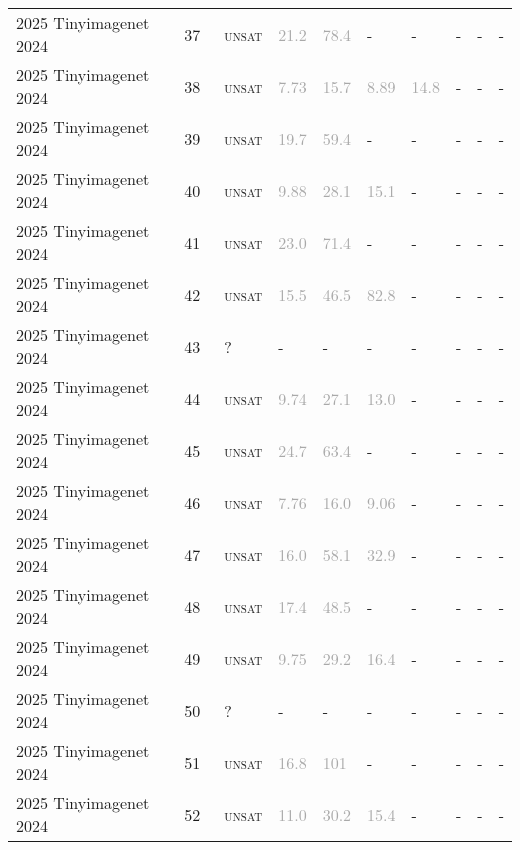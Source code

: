 \begin{center}
{\begin{longtable}{@{}llllllllll@{}}
2025 Tinyimagenet 2024 & 37 & ~\textsc{unsat} & \textcolor{darkgray}{21.2} & \textcolor{darkgray}{78.4} & - & - & - & - & - \\
2025 Tinyimagenet 2024 & 38 & ~\textsc{unsat} & \textcolor{darkgray}{7.73} & \textcolor{darkgray}{15.7} & \textcolor{darkgray}{8.89} & \textcolor{darkgray}{14.8} & - & - & - \\
2025 Tinyimagenet 2024 & 39 & ~\textsc{unsat} & \textcolor{darkgray}{19.7} & \textcolor{darkgray}{59.4} & - & - & - & - & - \\
2025 Tinyimagenet 2024 & 40 & ~\textsc{unsat} & \textcolor{darkgray}{9.88} & \textcolor{darkgray}{28.1} & \textcolor{darkgray}{15.1} & - & - & - & - \\
2025 Tinyimagenet 2024 & 41 & ~\textsc{unsat} & \textcolor{darkgray}{23.0} & \textcolor{darkgray}{71.4} & - & - & - & - & - \\
2025 Tinyimagenet 2024 & 42 & ~\textsc{unsat} & \textcolor{darkgray}{15.5} & \textcolor{darkgray}{46.5} & \textcolor{darkgray}{82.8} & - & - & - & - \\
2025 Tinyimagenet 2024 & 43 & ~? & - & - & - & - & - & - & - \\
2025 Tinyimagenet 2024 & 44 & ~\textsc{unsat} & \textcolor{darkgray}{9.74} & \textcolor{darkgray}{27.1} & \textcolor{darkgray}{13.0} & - & - & - & - \\
2025 Tinyimagenet 2024 & 45 & ~\textsc{unsat} & \textcolor{darkgray}{24.7} & \textcolor{darkgray}{63.4} & - & - & - & - & - \\
2025 Tinyimagenet 2024 & 46 & ~\textsc{unsat} & \textcolor{darkgray}{7.76} & \textcolor{darkgray}{16.0} & \textcolor{darkgray}{9.06} & - & - & - & - \\
2025 Tinyimagenet 2024 & 47 & ~\textsc{unsat} & \textcolor{darkgray}{16.0} & \textcolor{darkgray}{58.1} & \textcolor{darkgray}{32.9} & - & - & - & - \\
2025 Tinyimagenet 2024 & 48 & ~\textsc{unsat} & \textcolor{darkgray}{17.4} & \textcolor{darkgray}{48.5} & - & - & - & - & - \\
2025 Tinyimagenet 2024 & 49 & ~\textsc{unsat} & \textcolor{darkgray}{9.75} & \textcolor{darkgray}{29.2} & \textcolor{darkgray}{16.4} & - & - & - & - \\
2025 Tinyimagenet 2024 & 50 & ~? & - & - & - & - & - & - & - \\
2025 Tinyimagenet 2024 & 51 & ~\textsc{unsat} & \textcolor{darkgray}{16.8} & \textcolor{darkgray}{101} & - & - & - & - & - \\
2025 Tinyimagenet 2024 & 52 & ~\textsc{unsat} & \textcolor{darkgray}{11.0} & \textcolor{darkgray}{30.2} & \textcolor{darkgray}{15.4} & - & - & - & - \\

\end{longtable}}
\end{center}
